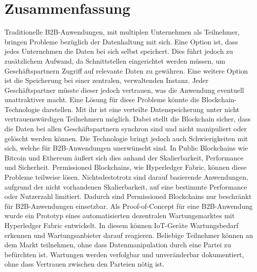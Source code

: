 \pagestyle{empty} %

\chapter*{Zusammenfassung} %
\label{cha:abtract}

Traditionelle \acs{B2B}-Anwendungen, mit multiplen Unternehmen als Teilnehmer, bringen Probleme bezüglich der Datenhaltung mit sich. Eine Option ist, dass jedes Unternehmen die Daten bei sich selbst speichert. Dies führt jedoch zu zusätzlichem Aufwand, da Schnittstellen eingerichtet werden müssen, um Geschäftspartnern Zugriff auf relevante Daten zu gewähren. Eine weitere Option ist die Speicherung bei einer zentralen, verwaltenden Instanz. Jeder Geschäftspartner müsste dieser jedoch vertrauen, was die Anwendung eventuell unattraktiver macht. Eine Lösung für diese Probleme könnte die Blockchain-Technologie darstellen. Mit ihr ist eine verteilte Datenspeicherung unter nicht vertrauenswürdigen Teilnehmern möglich. Dabei stellt die Blockchain sicher, dass die Daten bei allen Geschäftspartnern synchron sind und nicht manipuliert oder gelöscht werden können. Die Technologie bringt jedoch auch Schwierigkeiten mit sich, welche für \acs{B2B}-Anwendungen unerwünscht sind. In Public Blockchains wie Bitcoin und Ethereum äußert sich dies anhand der Skalierbarkeit, Performance und Sicherheit. Permissioned Blockchains, wie Hyperledger Fabric, können diese Probleme teilweise lösen. Nichtsdestotrotz sind darauf basierende Anwendungen, aufgrund der nicht vorhandenen Skalierbarkeit, auf eine bestimmte Performance oder Nutzerzahl limitiert. Dadurch sind Permissioned Blockchains nur beschränkt für \acs{B2B}-Anwendungen einsetzbar. Als Proof-of-Concept für eine \acs{B2B}-Anwendung wurde ein Prototyp eines automatisierten dezentralen Wartungsmarktes mit Hyperledger Fabric entwickelt. In diesem können \acs{IoT}-Geräte Wartungsbedarf erkennen und Wartungsanbieter darauf reagieren. Beliebige Teilnehmer können an dem Markt teilnehmen, ohne dass Datenmanipulation durch eine Partei zu befürchten ist. Wartungen werden verfolgbar und unveränderbar dokumentiert, ohne dass Vertrauen zwischen den Parteien nötig ist.

